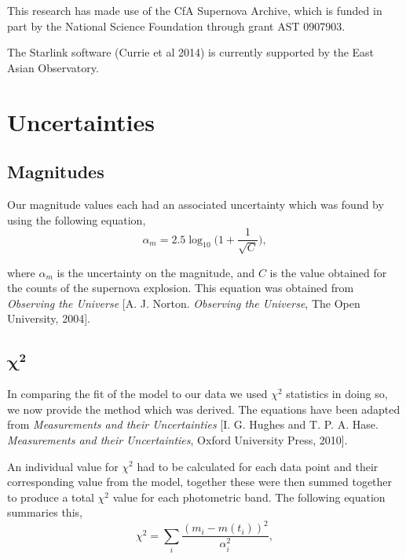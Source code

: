\documentclass[twocolumn]{revtex4}
\begin{document}
This research has made use of the CfA Supernova Archive, which is funded in part by the National Science Foundation through grant AST 0907903.

The Starlink software (Currie et al 2014) is currently supported by the East Asian Observatory.

\vspace{-3ex}



\clearpage

\appendix

\twocolumngrid
\vspace{-3ex}
\section{Uncertainties} \label{app:uncertainties}
\vspace{-2ex}
\subsection{Magnitudes}
\vspace{-2ex}
Our magnitude values each had an associated uncertainty which was found by using the following equation,
\begin{equation}
\alpha_{m} = 2.5 \log_{10} \Big(1 + \frac{1}{\sqrt{C}} \Big),
\label{eqn:mag_uncert}
\end{equation}

where $\alpha_{m}$ is the uncertainty on the magnitude, and $C$ is the value obtained for the counts of the supernova explosion. This equation was obtained from \textit{Observing the Universe} [A. J. Norton. \textit{Observing the Universe}, The Open University, 2004].

\vspace{-2ex}
\subsection{$\boldsymbol{\chi^2}$}
\vspace{-2ex}
In comparing the fit of the model to our data we used $\chi^2$ statistics in doing so, we now provide the method which was derived. The equations have been adapted from \textit{Measurements and their Uncertainties} [I. G. Hughes and T. P. A. Hase. \textit{Measurements and their Uncertainties}, Oxford University Press, 2010].

An individual value for $\chi^2$ had to be calculated for each data point and their corresponding value from the model, together these were then summed together to produce a total $\chi^2$ value for each photometric band. The following equation summaries this,
\begin{equation}
\chi^2 = \sum_i \frac{(m_i - m(t_i))^2}{\alpha_i^2}, 
\label{eqn:chisquared}
\end{equation}
\end{document}
